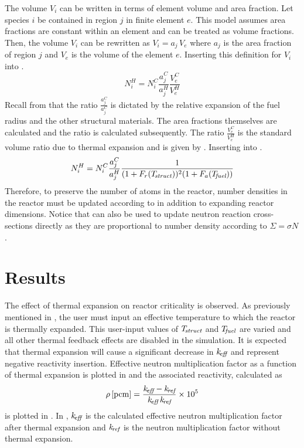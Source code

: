     The volume $V_i$ can be written in terms of element volume and area
    fraction. Let species $i$ be contained in region $j$ in finite element $e$. 
    This model assumes area fractions are constant within an element and can be
    treated as volume fractions. Then, the volume $V_i$ can be rewritten as 
    $V_i = a_j \, V_e$ where $a_j$ is the area fraction of region $j$ and $V_e$
    is the volume of the element $e$. Inserting this definition for $V_i$ into
    .
    \begin{equation}
      \label{eq:nden_expansion_expanded}
      N_i^H = N_i^C \frac{a_j^C}{a_j^H} \frac{V_e^C}{V_e^H}
    \end{equation}
    Recall from  that the
    ratio $\frac{a_j^C}{a_j^C}$ is dictated by the relative expansion of the
    fuel radius and the other structural materials. The area fractions
    themselves are calculated and the ratio is calculated subsequently. The 
    ratio $\frac{V_e^C}{V_e^H}$ is the standard volume ratio due to thermal 
    expansion and is given by . Inserting 
     into .
    \begin{equation}
      \label{eq:nden_thexp_update}
      N_i^H = N_i^C \frac{a_j^C}{a_j^H} 
        \frac{1}{(1+F_r(T_{\!\mbox{\scriptsize \em struct}}))^2 (1+F_a({T_{\!\mbox{\scriptsize \em fuel}}}))}
    \end{equation}
    Therefore, to preserve the number of atoms in the reactor, number densities
    in the reactor must be updated according to  in
    addition to expanding reactor dimensions. Notice that
     can also be used to update neutron reaction 
    cross-sections directly as they are proportional to number density according
    to $\Sigma = \sigma N$.

\section{Results}
  The effect of thermal expansion on reactor criticality is observed. As
  previously mentioned in , 
  the user must input an effective temperature to which the reactor is thermally 
  expanded. This user-input values of $T_{\!\mbox{\scriptsize \em struct}}$ and ${T_{\!\mbox{\scriptsize \em fuel}}}$ are varied 
  and all other thermal feedback effects are disabled in the simulation. It is 
  expected that thermal expansion will cause a significant decrease in $k_{\!\mbox{\scriptsize \em eff}}$ 
  and represent negative reactivity insertion. Effective neutron multiplication 
  factor as a function of thermal expansion is plotted in  
  and the associated reactivity, calculated as
  \begin{equation}
    \label{eq:reactivity_formula}
    \rho \left[\text{{pcm}}\right] = \frac{k_{\!\mbox{\scriptsize \em eff}} - k_{\!\mbox{\scriptsize \em ref}}}{k_{\!\mbox{\scriptsize \em eff}} \, k_{\!\mbox{\scriptsize \em ref}}} \times 10^5
  \end{equation}
  is plotted in . In
  , $k_{\!\mbox{\scriptsize \em eff}}$ is the calculated effective neutron 
  multiplication factor after thermal expansion and $k_{\!\mbox{\scriptsize \em ref}}$ is the neutron 
  multiplication factor without thermal expansion. 

